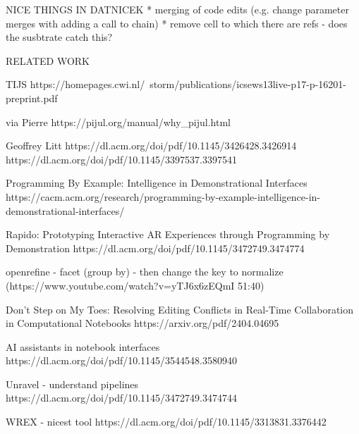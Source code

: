 \documentclass[sigconf,anonymous,screen]{acmart}
\begin{document}
NICE THINGS IN DATNICEK
* merging of code edits (e.g. change parameter merges with adding a call to chain)
* remove cell to which there are refs - does the susbtrate catch this?

RELATED WORK

TIJS
https://homepages.cwi.nl/~storm/publications/icsews13live-p17-p-16201-preprint.pdf

via Pierre
https://pijul.org/manual/why_pijul.html

Geoffrey Litt
https://dl.acm.org/doi/pdf/10.1145/3426428.3426914
https://dl.acm.org/doi/pdf/10.1145/3397537.3397541

Programming By Example: Intelligence in Demonstrational Interfaces
https://cacm.acm.org/research/programming-by-example-intelligence-in-demonstrational-interfaces/

Rapido: Prototyping Interactive AR Experiences through
Programming by Demonstration
https://dl.acm.org/doi/pdf/10.1145/3472749.3474774

openrefine
- facet (group by) - then change the key to normalize
  (https://www.youtube.com/watch?v=yTJ6x6zEQmI 51:40)

Don't Step on My Toes: Resolving Editing Conflicts in Real-Time
Collaboration in Computational Notebooks
https://arxiv.org/pdf/2404.04695

AI assistants in notebook interfaces
https://dl.acm.org/doi/pdf/10.1145/3544548.3580940

Unravel - understand pipelines
https://dl.acm.org/doi/pdf/10.1145/3472749.3474744

WREX - nicest tool
https://dl.acm.org/doi/pdf/10.1145/3313831.3376442
\end{document}
